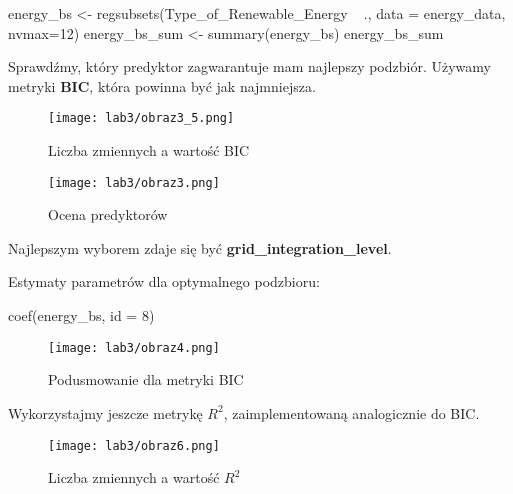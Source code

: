 \begin{Rcode}
energy_bs <- regsubsets(Type_of_Renewable_Energy ~ ., data = energy_data, nvmax=12)
energy_bs_sum <- summary(energy_bs)
energy_bs_sum
\end{Rcode}

Sprawdźmy, który predyktor zagwarantuje mam najlepszy podzbiór. Używamy metryki \textbf{BIC}, która powinna być jak najmniejsza.


\begin{figure}[H]
    \centering
    \texttt{[image: lab3/obraz3\_5.png]}
    \caption{Liczba zmiennych a wartość BIC}
    \label{fig:enter-label}
\end{figure}

\begin{figure}[H]
    \centering
    \texttt{[image: lab3/obraz3.png]}
    \caption{Ocena predyktorów}
    \label{fig:enter-label}
\end{figure}

Najlepszym wyborem zdaje się być \textbf{grid\_integration\_level}.

Estymaty parametrów dla optymalnego podzbioru:

\begin{Rcode}
coef(energy_bs, id = 8)
\end{Rcode}

\begin{figure}[H]
    \centering
    \texttt{[image: lab3/obraz4.png]}
    \caption{Podusmowanie dla metryki BIC}
    \label{fig:enter-label}
\end{figure}

Wykorzystajmy jeszcze metrykę \textbf{$R^2$}, zaimplementowaną analogicznie do BIC.

\begin{figure}[H]
    \centering
    \texttt{[image: lab3/obraz6.png]}
    \caption{Liczba zmiennych a wartość $R^2$}
    \label{fig:enter-label}
\end{figure}

